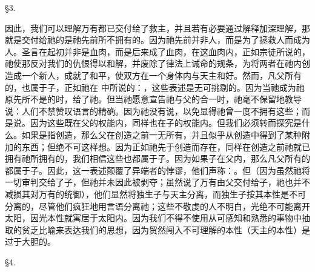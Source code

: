 §3. \par

因此，我们可以理解万有都已交付给了救主，并且若有必要通过解释加深理解，那就是交付给祂的是祂先前所不拥有的。因为祂先前并非人，而是为了拯救人而成为人。圣言在起初并非是血肉，而是后来成了血肉，在这血肉内，正如宗徒所说的，祂使那反对我们的仇恨得以和解，并废除了律法上诫命的规条，为将两者在祂内创造成一个新人，成就了和平，使双方在一个身体内与天主和好。然而，凡父所有的，也属于子，正如祂在 中所说的：，这些表述是无可挑剔的。因为当祂成为祂原先所不是的时，给了祂。但当祂愿意宣告祂与父的合一时，祂毫不保留地教导说：人们不禁赞叹语言的精确。因为祂没有说，以免显得祂曾一度不拥有这些；而是说。因为这些既在父的权能内，同样也在子的权能内。但我们必须转而探究是什么。如果是指创造，那么父在创造之前一无所有，并且似乎从创造中得到了某种附加的东西；但绝不可这样想。因为正如祂先于创造而存在，同样在创造之前祂就已拥有祂所拥有的，我们相信这些也都属于子。因为如果子在父内，那么凡父所有的都属于子。因此，这一表述颠覆了异端者的悖谬，他们声称：。但（因为虽然祂将一切审判交给了子，但祂并未因此被剥夺；虽然说了万有由父交付给子，祂也并不减损其对万有的统御），他们显然将独生子与天主分离，而独生子按其本性是不可分离的，尽管他们疯狂地用言语分离祂；这些不敬虔的人不明白，光绝不可能离开太阳，因光本性就寓居于太阳内。因为我们不得不使用从可感知和熟悉的事物中抽取的贫乏比喻来表达我们的思想，因为贸然闯入不可理解的本性（天主的本性）是过于大胆的。\par

§4. \par

